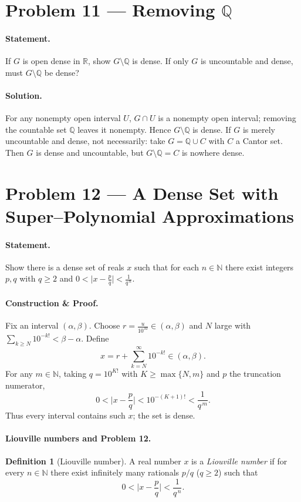 \documentclass[12pt,a4paper]{article}
\theoremstyle{plain}
\theoremstyle{definition}
\newtheorem{definition}[theorem]{Definition}
\theoremstyle{remark}
\theoremstyle{remark}
\begin{document}
\bigskip
\section*{Problem 11 — Removing $\mathbb Q$}

\paragraph{Statement.}
If $G$ is open dense in $\mathbb R$, show $G\setminus\mathbb Q$ is dense. If only $G$ is uncountable and dense, must $G\setminus\mathbb Q$ be dense?

\paragraph{Solution.}
For any nonempty open interval $U$, $G\cap U$ is a nonempty open interval; removing the countable set $\mathbb Q$ leaves it nonempty. Hence $G\setminus\mathbb Q$ is dense.
If $G$ is merely uncountable and dense, not necessarily: take $G=\mathbb Q\cup C$ with $C$ a Cantor set. Then $G$ is dense and uncountable, but $G\setminus\mathbb Q=C$ is nowhere dense.

\bigskip
\section*{Problem 12 — A Dense Set with Super–Polynomial Approximations}

\paragraph{Statement.}
Show there is a dense set of reals $x$ such that for each $n\in\mathbb N$ there exist integers $p,q$ with $q\ge2$ and
$
0<\big|x-\frac{p}{q}\big|<\frac{1}{q^{\,n}}.
$

\paragraph{Construction \& Proof.}
Fix an interval $(\alpha,\beta)$. Choose $r=\frac{u}{10^M}\in(\alpha,\beta)$ and $N$ large with
$\sum_{k\ge N}10^{-k!}<\beta-\alpha$. Define
\[
x=r+\sum_{k=N}^{\infty}10^{-k!}\in(\alpha,\beta).
\]
For any $m\in\mathbb N$, taking $q=10^{K!}$ with $K\ge\max\{N,m\}$ and $p$ the truncation numerator,
\[
0<\Big|x-\frac{p}{q}\Big|<10^{-(K+1)!}<\frac{1}{q^{\,m}}.
\]
Thus every interval contains such $x$; the set is dense.

\paragraph{Liouville numbers and Problem 12.}
\begin{definition}[Liouville number]
	A real number $x$ is a \emph{Liouville number} if for every $n\in\mathbb N$ there exist
	infinitely many rationals $p/q$ ($q\ge2$) such that
	\[
	0<\Big|x-\frac{p}{q}\Big|<\frac{1}{q^{\,n}}.
	\]
\end{definition}
\end{document}
